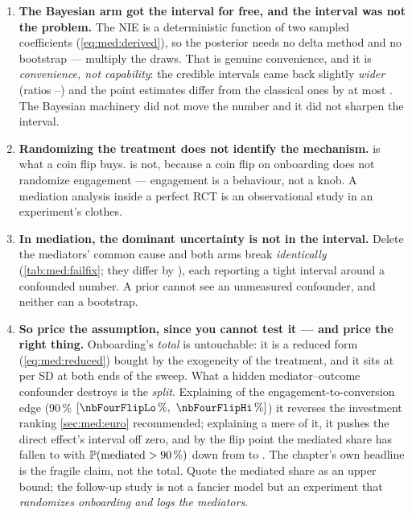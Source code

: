 \begin{enumerate}[leftmargin=*, itemsep=.45em]
  \item \textbf{The Bayesian arm got the interval for free, and the interval was not the problem.}
        The NIE is a deterministic function of two sampled coefficients (\cref{eq:med:derived}), so
        the posterior needs no delta method and no bootstrap --- multiply the draws. That is genuine
        convenience, and it is \emph{convenience, not capability}: the credible intervals came back
        slightly \emph{wider} (ratios \nbFourWidthMin--\nbFourWidthMax) and the point estimates
        differ from the classical ones by at most \nbFourMaxGap. The Bayesian machinery did not move
        the number and it did not sharpen the interval.

  \item \textbf{Randomizing the treatment does not identify the mechanism.}  is what
        a coin flip buys.  is not, because a coin flip on onboarding does not
        randomize engagement --- engagement is a behaviour, not a knob. A mediation analysis inside a
        perfect RCT is an observational study in an experiment's clothes.

  \item \textbf{In mediation, the dominant uncertainty is not in the interval.} Delete the mediators'
        common cause and both arms break \emph{identically} (\cref{tab:med:failfix}; they differ by
        \nbFourBadArmGap), each reporting a tight interval around a confounded number. A prior cannot
        see an unmeasured confounder, and neither can a bootstrap.

  \item \textbf{So price the assumption, since you cannot test it --- and price the right thing.}
        Onboarding's \emph{total} is untouchable: it is a reduced form
        (\cref{eq:med:reduced}) bought by the exogeneity of the treatment, and it sits at
        \eur{\nbFourOnbValSweepStart} per SD at both ends of the sweep. What a hidden
        mediator--outcome confounder destroys is the \emph{split}. Explaining \pc{\nbFourFlipMed} of
        the engagement-to-conversion edge (90\,\% $[\pc{\nbFourFlipLo},\ \pc{\nbFourFlipHi}]$) it
        reverses the investment ranking \cref{sec:med:euro} recommended; explaining a mere
        \pc{\nbFourNdeClearsZeroPct} of it, it pushes the direct effect's interval off zero, and by
        the flip point the mediated share has fallen to \pc{\nbFourPropMedAtFlip} with
        $\operatorname{\mathbb{P}}(\text{mediated} > 90\,\%)$ down from \nbFourPPropGtNinety{} to
        \nbFourPPropGtNinetyAtFlip. The chapter's own headline is the fragile claim, not the total.
        Quote the mediated share as an upper bound; the follow-up study is not a fancier model but an
        experiment that \emph{randomizes onboarding and logs the mediators}.


\end{enumerate}
